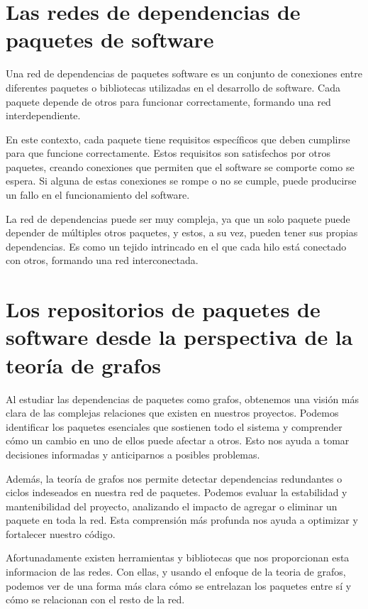

\section{Las redes de dependencias de paquetes de software}

Una red de dependencias de paquetes software es un conjunto de conexiones entre diferentes paquetes o bibliotecas utilizadas en el desarrollo de software. Cada paquete depende de otros para funcionar correctamente, formando una red interdependiente.

En este contexto, cada paquete tiene requisitos específicos que deben cumplirse para que funcione correctamente. Estos requisitos son satisfechos por otros paquetes, creando conexiones que permiten que el software se comporte como se espera. Si alguna de estas conexiones se rompe o no se cumple, puede producirse un fallo en el funcionamiento del software.

La red de dependencias puede ser muy compleja, ya que un solo paquete puede depender de múltiples otros paquetes, y estos, a su vez, pueden tener sus propias dependencias. Es como un tejido intrincado en el que cada hilo está conectado con otros, formando una red interconectada.

\section{Los repositorios de paquetes de software desde la perspectiva de la teoría de grafos}

Al estudiar las dependencias de paquetes como grafos, obtenemos una visión más clara de las complejas relaciones que existen en nuestros proyectos. Podemos identificar los paquetes esenciales que sostienen todo el sistema y comprender cómo un cambio en uno de ellos puede afectar a otros. Esto nos ayuda a tomar decisiones informadas y anticiparnos a posibles problemas.

Además, la teoría de grafos nos permite detectar dependencias redundantes o ciclos indeseados en nuestra red de paquetes. Podemos evaluar la estabilidad y mantenibilidad del proyecto, analizando el impacto de agregar o eliminar un paquete en toda la red. Esta comprensión más profunda nos ayuda a optimizar y fortalecer nuestro código.

Afortunadamente existen herramientas y bibliotecas que nos proporcionan esta informacion de las redes. Con ellas, y usando el enfoque de la teoria de grafos, podemos ver de una forma más clara cómo se entrelazan los paquetes entre sí y cómo se relacionan con el resto de la red.

